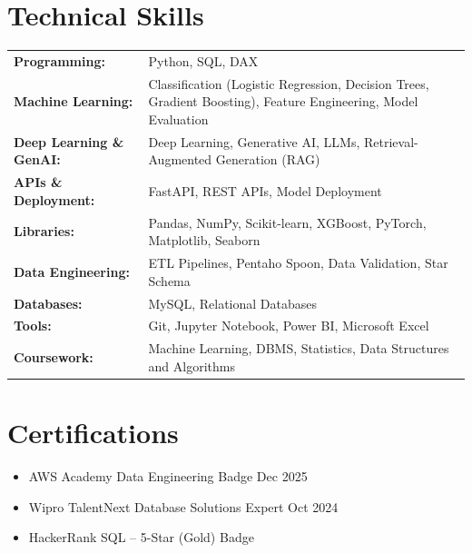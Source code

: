 \documentclass[a4paper,12pt]{article}
\begin{document}
\section{Technical Skills}
\begin{tabularx}{\linewidth}{@{}l X@{}}
\textbf{Programming:} & \normalsize{Python, SQL, DAX}\\
\textbf{Machine Learning:} & \normalsize{Classification (Logistic Regression, Decision Trees, Gradient Boosting), Feature Engineering, Model Evaluation}\\
\textbf{Deep Learning \& GenAI:} & \normalsize{Deep Learning, Generative AI, LLMs, Retrieval-Augmented Generation (RAG)}\\
\textbf{APIs \& Deployment:} & \normalsize{FastAPI, REST APIs, Model Deployment}\\
\textbf{Libraries:} & \normalsize{Pandas, NumPy, Scikit-learn, XGBoost, PyTorch, Matplotlib, Seaborn}\\
\textbf{Data Engineering:} & \normalsize{ETL Pipelines, Pentaho Spoon, Data Validation, Star Schema}\\
\textbf{Databases:} & \normalsize{MySQL, Relational Databases}\\
\textbf{Tools:} & \normalsize{Git, Jupyter Notebook, Power BI, Microsoft Excel}\\
\textbf{Coursework:} & \normalsize{Machine Learning, DBMS, Statistics, Data Structures and Algorithms}\\

\end{tabularx}


\section{Certifications}

\begin{itemize}[leftmargin=1em, itemsep=10pt, label=--]
    \item AWS Academy Data Engineering Badge \hfill Dec 2025
    \item Wipro TalentNext Database Solutions Expert \hfill Oct 2024
    \item HackerRank SQL -- 5-Star (Gold) Badge
\end{itemize}


\vfill
\center
\end{document}
